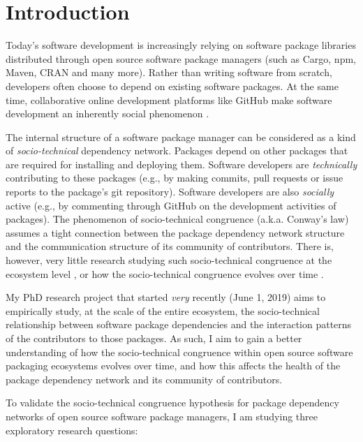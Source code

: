 \section{Introduction}
\label{sec:intro}

Today's software development is increasingly relying on software package libraries distributed through open source software package managers (such as Cargo, npm, Maven, CRAN and many more). Rather than writing software from scratch, developers often choose to depend on existing software packages.
At the same time, collaborative online development platforms like GitHub make software development an inherently social phenomenon \cite{DabbishSTH12,Mens2019IEEESW}.

The internal structure of a software package manager can be considered as a kind of \emph{socio-technical} dependency network. Packages depend on other packages that are required for installing and deploying them. Software developers are \emph{technically} contributing to these packages (e.g., by making commits, pull requests or issue reports to the package's git repository). Software developers are also \emph{socially} active (e.g., by commenting through GitHub on the development activities of packages).
The phenomenon of socio-technical congruence (a.k.a. Conway's law) \cite{Conway1968, Herbsleb1999} assumes a tight connection between the package dependency network structure and the communication structure of its community of contributors. There is, however, very little research studying such socio-technical congruence at the ecosystem level \cite{Palyart2018TSE}, or how the socio-technical congruence evolves over time \cite{Cataldo2008}.

My PhD research project that started \emph{very} recently (June 1, 2019) aims to empirically study, at the scale of the entire ecosystem, the socio-technical relationship between software package dependencies and the interaction patterns of the contributors to those packages.
As such, I aim to gain a better understanding of how the socio-technical congruence within open source software packaging ecosystems evolves over time, and how this affects the health of the package dependency network and its community of contributors.

To validate the socio-technical congruence hypothesis for package dependency networks of open source software package managers, I am studying three exploratory research questions: 


